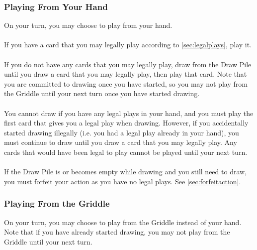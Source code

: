 \documentclass{article}
\begin{document}
\subsubsection{Playing From Your Hand}
\label{sec:fromhand}

On your turn, you may choose to play from your hand.

\paragraph{} \label{par:playifpossible}
If you have a card that you may legally play according to \autoref{sec:legalplays}, play it.

\paragraph{} \label{par:draw}
If you do not have any cards that you may legally play, draw from the Draw Pile until you draw a card that you may legally play, then play that card. Note that you are committed to drawing once you have started, so you may not play from the Griddle until your next turn once you have started drawing.

\paragraph{} \label{par:drawrestrictions}
You cannot draw if you have any legal plays in your hand, and you must play the first card that gives you a legal play when drawing.
However, if you accidentally started drawing illegally (i.e. you had a legal play already in your hand), you must continue to draw until you draw a card that you may legally play. Any cards that would have been legal to play cannot be played until your next turn.

\paragraph{} \label{par:emptydrawpile}
If the Draw Pile is or becomes empty while drawing and you still need to draw, you must forfeit your action as you have no legal plays. See \autoref{sec:forfeitaction}.

\subsubsection{Playing From the Griddle}
\label{sec:fromstack}

On your turn, you may choose to play from the Griddle instead of your hand. Note that if you have already started drawing, you may not play from the Griddle until your next turn.
\end{document}
